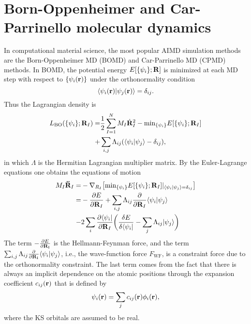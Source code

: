 \section{Born-Oppenheimer and Car-Parrinello molecular dynamics}\label{section_BOMD}
In computational material science, the most popular AIMD simulation methods are the Born-Oppenheimer MD (BOMD) and Car-Parrinello MD (CPMD) methods. 
In BOMD, the potential energy $E[\{\psi_i\};\bf{R}]$ is minimized at each MD step with respect to $\{\psi_i({\bf r})\}$  under the orthonormality condition
\begin{equation}
\langle\psi_i({\bf{r}})|\psi_j({\bf r})\rangle=\delta_{ij}.
\label{eq:e_XC}
\end{equation}
Thus the Lagrangian density is 
\begin{align}
L_\text{BO} (\{\psi_i\}; {\bf R}_{I})=&\frac{1}{2}\sum^N_{I=1}M_{I}\dot{\bf R}^2_{I} - {\text{min}}_{\{\psi_i\}}E[\{\psi_i\};{\bf R}_{I}] \nonumber \\
             +& \sum_{i,j}\Lambda_{ij}(\langle\psi_i|\psi_j\rangle-\delta_{ij} ),
\label{eq:L_BO}
\end{align}
in which $\Lambda$ is the Hermitian Lagrangian multiplier matrix. By the Euler-Lagrange equations one obtains the equations of motion
\begin{align}
     M_{I}{\bf \ddot{R}}_I =& -\nabla_{R_I} \bigl[ {\text{min}}_{\{\psi_i\}}E[\{\psi_i\};{\bf R}_I] |_{\langle\psi_i|\psi_j\rangle=\delta_{ij} }\bigr]\nonumber \\
     =&-\frac{\partial E}{\partial {\bf R}_{I}}  + \sum_{i,j}\Lambda_{ij}\frac{\partial}{\partial {\bf R}_I}\langle\psi_i|\psi_j\rangle \nonumber \\
     -&2\sum_i \frac{\partial \langle\psi_i|}{\partial {\bf R}_I}\biggl(\frac{\delta E}{\delta\langle\psi_i|}-\sum_j \Lambda_{ij}|\psi_j\rangle\biggr) 
\label{eq:LEE_BO}
\end{align}
The term $-\frac{\partial E}{\partial {\bf R}_{\text{I}}}$ is the Hellmann-Feynman force, and the term $\sum_{i,j}\Lambda_{ij}\frac{\partial}{\partial {\bf R}_{\text{I}}}\langle\psi_i|\psi_j\rangle$, i.e., the wave-function force $F_{\text{WF}}$\cite{Pulay1969}, is a constraint force due to the orthonormality constraint. The last term comes from the fact that there is always an implicit dependence on the atomic positions through the expansion coefficient $c_{ij}({\bf r})$ that is defined by 
\begin{equation}
\psi_i({\bf r})=\sum_j c_{ij}({\bf r})\phi_i({\bf r}),
\label{eq:linear_combination}
\end{equation}
where the KS orbitals are assumed to be real.


